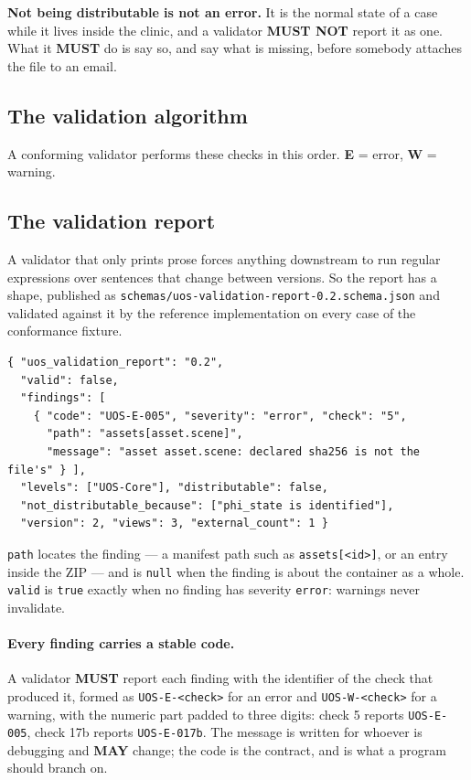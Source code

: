 \documentclass[11pt,a4paper]{article}
\newcommand{\MUST}{\textcolor{uosred}{\textbf{MUST}}}
\newcommand{\MUSTNOT}{\textcolor{uosred}{\textbf{MUST NOT}}}
\newcommand{\MAY}{\textcolor{uosgreen}{\textbf{MAY}}}
\newcommand{\code}[1]{\texttt{\small #1}}
\begin{document}
\textbf{Not being distributable is not an error.} It is the normal state of a case while it
lives inside the clinic, and a validator \MUSTNOT{} report it as one. What it \MUST{} do is
say so, and say what is missing, before somebody attaches the file to an email.

\subsection{The validation algorithm}\label{sec:algo}

A conforming validator performs these checks in this order. \textbf{E} = error,
\textbf{W} = warning.

\subsection{The validation report}\label{sec:report}

A validator that only prints prose forces anything downstream to run regular expressions
over sentences that change between versions. So the report has a shape, published as
\code{schemas/uos-validation-report-0.2.schema.json} and validated against it by the
reference implementation on every case of the conformance fixture.

\begin{lstlisting}[style=js]
{ "uos_validation_report": "0.2",
  "valid": false,
  "findings": [
    { "code": "UOS-E-005", "severity": "error", "check": "5",
      "path": "assets[asset.scene]",
      "message": "asset asset.scene: declared sha256 is not the file's" } ],
  "levels": ["UOS-Core"], "distributable": false,
  "not_distributable_because": ["phi_state is identified"],
  "version": 2, "views": 3, "external_count": 1 }
\end{lstlisting}

\code{path} locates the finding --- a manifest path such as \code{assets[<id>]}, or an
entry inside the ZIP --- and is \code{null} when the finding is about the container as a
whole. \code{valid} is \code{true} exactly when no finding has severity \code{error}:
warnings never invalidate.

\paragraph{Every finding carries a stable code.} A validator \MUST{} report each
finding with the identifier of the check that produced it, formed as
\code{UOS-E-<check>} for an error and \code{UOS-W-<check>} for a warning, with the numeric
part padded to three digits: check 5 reports \code{UOS-E-005}, check 17b reports
\code{UOS-E-017b}. The message is written for whoever is debugging and \MAY{} change; the
code is the contract, and is what a program should branch on.
\end{document}
